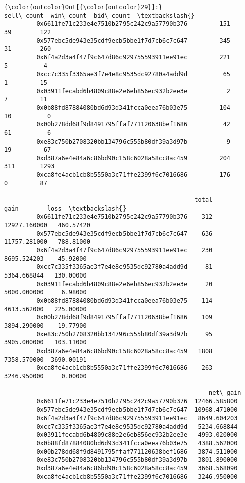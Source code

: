 \documentclass[11pt]{article}
\begin{document}
\begin{Verbatim}[commandchars=\\\{\}]
{\color{outcolor}Out[{\color{outcolor}29}]:}                                             sell\_count  win\_count  bid\_count  \textbackslash{}
         0x6611fe71c233e4e7510b2795c242c9a57790b376         151         39        122   
         0x577ebc5de943e35cdf9ecb5bbe1f7d7cb6c7c647         345         31        260   
         0x6f4a2d3a4f47f9c647d86c929755593911ee91ec         221          5          4   
         0xcc7c335f3365ae3f7e4e8c9535dc92780a4add9d          65          1         15   
         0x03911fecabd6b4809c88e2e6eb856ec932b2ee3e           2          7         11   
         0x0b88fd87884080bd6d93d341fcca0eea76b03e75         104         10          0   
         0x00b278dd68f9d8491795ffaf771120638bef1686          42         61          6   
         0xe83c750b2708320bb134796c555b80df39a3d97b           9         19         67   
         0xd387a6e4e84a6c86bd90c158c6028a58cc8ac459         204        311       1293   
         0xca8fe4acb1cb8b5550a3c71ffe2399f6c7016686         176          0         87   
         
                                                     total          gain        loss  \textbackslash{}
         0x6611fe71c233e4e7510b2795c242c9a57790b376    312  12927.160000   460.57420   
         0x577ebc5de943e35cdf9ecb5bbe1f7d7cb6c7c647    636  11757.281000   788.81000   
         0x6f4a2d3a4f47f9c647d86c929755593911ee91ec    230   8695.524203    45.92000   
         0xcc7c335f3365ae3f7e4e8c9535dc92780a4add9d     81   5364.668844   130.00000   
         0x03911fecabd6b4809c88e2e6eb856ec932b2ee3e     20   5000.000000     6.98000   
         0x0b88fd87884080bd6d93d341fcca0eea76b03e75    114   4613.562000   225.00000   
         0x00b278dd68f9d8491795ffaf771120638bef1686    109   3894.290000    19.77900   
         0xe83c750b2708320bb134796c555b80df39a3d97b     95   3905.000000   103.11000   
         0xd387a6e4e84a6c86bd90c158c6028a58cc8ac459   1808   7358.570000  3690.00191   
         0xca8fe4acb1cb8b5550a3c71ffe2399f6c7016686    263   3246.950000     0.00000   
         
                                                         net\_gain  
         0x6611fe71c233e4e7510b2795c242c9a57790b376  12466.585800  
         0x577ebc5de943e35cdf9ecb5bbe1f7d7cb6c7c647  10968.471000  
         0x6f4a2d3a4f47f9c647d86c929755593911ee91ec   8649.604203  
         0xcc7c335f3365ae3f7e4e8c9535dc92780a4add9d   5234.668844  
         0x03911fecabd6b4809c88e2e6eb856ec932b2ee3e   4993.020000  
         0x0b88fd87884080bd6d93d341fcca0eea76b03e75   4388.562000  
         0x00b278dd68f9d8491795ffaf771120638bef1686   3874.511000  
         0xe83c750b2708320bb134796c555b80df39a3d97b   3801.890000  
         0xd387a6e4e84a6c86bd90c158c6028a58cc8ac459   3668.568090  
         0xca8fe4acb1cb8b5550a3c71ffe2399f6c7016686   3246.950000  
\end{Verbatim}
            
\end{document}
